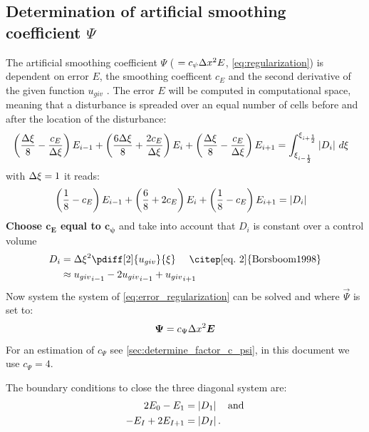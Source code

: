 \subsection{Determination of artificial smoothing coefficient $\Psi$}\label{sec:determine_psi}
The artificial smoothing coefficient $\Psi$ ( $ = c_{\psi} \Delta x^2 E$, \autoref{eq:regularization}) is dependent on error $E$, the smoothing coefficent $c_E$ and the second derivative of the given function $u_{giv}$ \citep[eq.\ 8]{Borsboom1998}.
The error $E$ will be computed in computational space, meaning that a disturbance is spreaded over an equal number of cells before and after the location of the disturbance:
%
\begin{align}
    &\left(\frac{\Delta \xi}{8}-\frac{c_E}{\Delta \xi}\right) E_{i-1} + \left(\frac{6\Delta \xi}{8} + \frac{2c_E}{\Delta \xi}\right) E_i + \left(\frac{\Delta \xi}{8} - \frac{c_E}{\Delta \xi}\right)E_{i+1}
    =  \int_{\xi_{i-\frac{1}{2}}}^{\xi_{i+\frac{1}{2}}} \left| D_i \right| \, d\xi
    \label{eq:error_regularization}
\end{align}
with $\Delta \xi =1$ it reads:
\begin{align}
    &\left(\frac{1}{8}-c_E\right) E_{i-1} + \left(\frac{6}{8} + 2c_E\right) E_i + \left(\frac{1}{8} - c_E\right)E_{i+1}
    =   \left| D_i \right|
    \label{eq:error_regularization}
\end{align}
\textbf{Choose $\mathbf{c_E}$ equal to $\mathbf{c_{\psi}}$} and take into account that $D_i$ is constant over a control volume
\begin{align}
    D_i & = \Dxi^2 \pdiff[2]{u_{giv}}{\xi} \quad \text{ \citep[eq.\ 2]{Borsboom1998}}
    \\ & \approx {u_{giv}}_{i-1} - 2 {u_{giv}}_{i-1} + {u_{giv}}_{i+1}
\end{align}
%
Now system the system of \autoref{eq:error_regularization} can be solved and where $\vec{\Psi}$ is set to:
\begin{align}
    \mbox{\boldmath $\Psi$} = c_{\Psi}\Delta x^2 \mbox{\boldmath $E$}
\end{align}
For an estimation of $c_{\Psi}$ see \autoref{sec:determine_factor_c_psi}, in this document we use $c_{\Psi} = 4$.

The boundary conditions to close the three diagonal system are:
\begin{align}
    2 E_0 - E_1 & = \left| D_{1} \right| \quad \text{and}
    \\
    - E_{I} + 2 E_{I+1} & = \left| D_{I} \right|.
\end{align}

